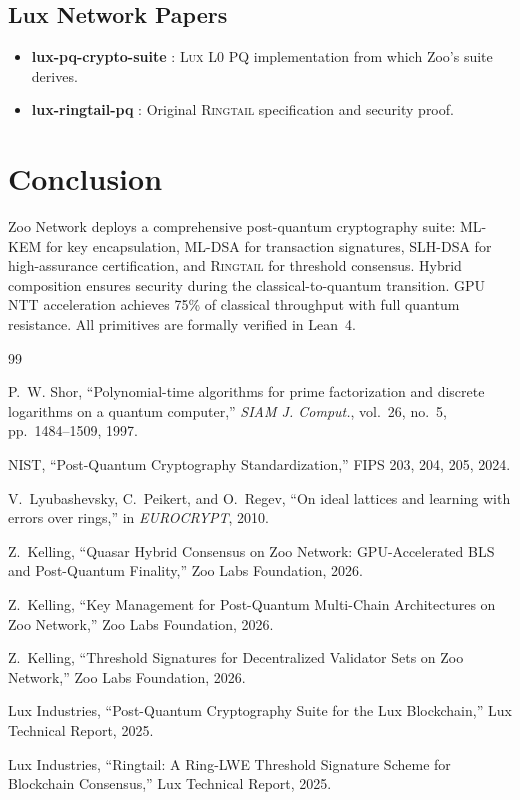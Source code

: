 \documentclass[11pt,letterpaper]{article}
\theoremstyle{definition}
\theoremstyle{remark}
\newcommand{\Lux}{\textsc{Lux}}
\newcommand{\Ringtail}{\textsc{Ringtail}}
\newcommand{\MLKEM}{\textsc{ML-KEM}}
\newcommand{\MLDSA}{\textsc{ML-DSA}}
\newcommand{\SLHDSA}{\textsc{SLH-DSA}}
\begin{document}
\subsection{Lux Network Papers}

\begin{itemize}
\item \textbf{lux-pq-crypto-suite} \cite{lux-pq-crypto}: \Lux{} L0 PQ implementation from which Zoo's suite derives.
\item \textbf{lux-ringtail-pq} \cite{lux-ringtail-pq}: Original \Ringtail{} specification and security proof.
\end{itemize}

\section{Conclusion}

Zoo Network deploys a comprehensive post-quantum cryptography suite: \MLKEM{} for key encapsulation, \MLDSA{} for transaction signatures, \SLHDSA{} for high-assurance certification, and \Ringtail{} for threshold consensus. Hybrid composition ensures security during the classical-to-quantum transition. GPU NTT acceleration achieves 75\% of classical throughput with full quantum resistance. All primitives are formally verified in Lean~4.

\begin{thebibliography}{99}

P.~W. Shor, ``Polynomial-time algorithms for prime factorization and discrete logarithms on a quantum computer,'' \textit{SIAM J. Comput.}, vol.~26, no.~5, pp.~1484--1509, 1997.

NIST, ``Post-Quantum Cryptography Standardization,'' FIPS 203, 204, 205, 2024.

V.~Lyubashevsky, C.~Peikert, and O.~Regev, ``On ideal lattices and learning with errors over rings,'' in \textit{EUROCRYPT}, 2010.

Z.~Kelling, ``Quasar Hybrid Consensus on Zoo Network: GPU-Accelerated BLS and Post-Quantum Finality,'' Zoo Labs Foundation, 2026.

Z.~Kelling, ``Key Management for Post-Quantum Multi-Chain Architectures on Zoo Network,'' Zoo Labs Foundation, 2026.

Z.~Kelling, ``Threshold Signatures for Decentralized Validator Sets on Zoo Network,'' Zoo Labs Foundation, 2026.

Lux Industries, ``Post-Quantum Cryptography Suite for the Lux Blockchain,'' Lux Technical Report, 2025.

Lux Industries, ``Ringtail: A Ring-LWE Threshold Signature Scheme for Blockchain Consensus,'' Lux Technical Report, 2025.

\end{thebibliography}
\end{document}
